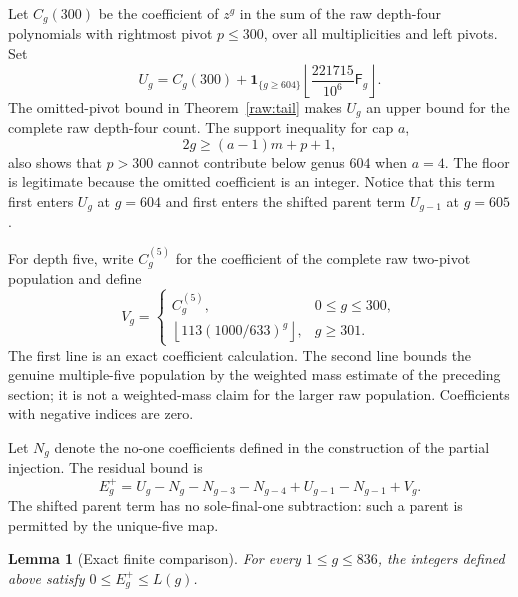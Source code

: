 \documentclass[11pt]{amsart}
\newtheorem{lemma}[theorem]{Lemma}
\theoremstyle{definition}
\theoremstyle{remark}
\newcommand{\Fib}{\mathsf F}
\numberwithin{equation}{section}
\begin{document}
Let $C_g(300)$ be the coefficient of $z^g$ in the sum of the raw
depth-four polynomials with rightmost pivot $p\le300$, over all
multiplicities and left pivots. Set
\begin{equation}\label{cmp:U}
 U_g=C_g(300)+\mathbf1_{\{g\ge604\}}
       \left\lfloor\frac{221715}{10^6}\Fib_g\right\rfloor.
\end{equation}
The omitted-pivot bound in Theorem~\ref{raw:tail} makes $U_g$ an upper
bound for the complete raw depth-four count. The support inequality for cap $a$,
\begin{equation}\label{cmp:support}
 2g\ge(a-1)m+p+1,
\end{equation}
also shows that $p>300$ cannot contribute below genus $604$ when $a=4$.
The floor is legitimate because the omitted coefficient is an integer.
Notice that this term first enters $U_g$ at $g=604$ and first enters the
shifted parent term $U_{g-1}$ at $g=605$.

For depth five, write $C^{(5)}_g$ for the coefficient of the complete raw
two-pivot population and define
\begin{equation}\label{cmp:V}
 V_g=\begin{cases}
 C^{(5)}_g,&0\le g\le300,\\
 \left\lfloor113(1000/633)^g\right\rfloor,&g\ge301.
 \end{cases}
\end{equation}
The first line is an exact coefficient calculation. The second line bounds
the genuine multiple-five population by the weighted mass estimate of the
preceding section; it is not a weighted-mass claim for the larger raw
population. Coefficients with negative indices are zero.

Let $N_g$ denote the no-one coefficients defined in the construction of the
partial injection. The residual bound is
\begin{equation}\label{cmp:residual}
 E^+_g=U_g-N_g-N_{g-3}-N_{g-4}
       +U_{g-1}-N_{g-1}+V_g.
\end{equation}
The shifted parent term has no sole-final-one subtraction: such a parent is
permitted by the unique-five map.

\begin{lemma}[Exact finite comparison]\label{cmp:finite}
For every $1\le g\le836$, the integers defined above satisfy
$0\le E^+_g\le L(g)$.
\end{lemma}
\end{document}
